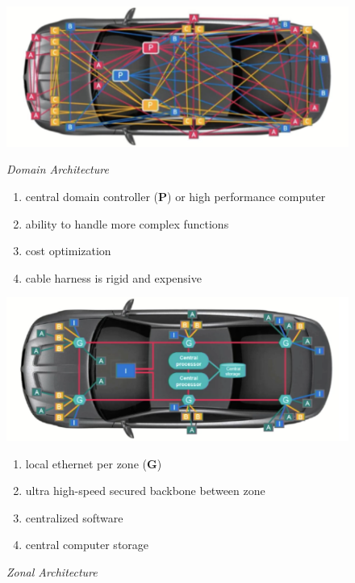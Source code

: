 \begin{figure}[h]
    \centering
    \begin{minipage}[t]{0.45\textwidth}
        \centering
        \includegraphics[width=\textwidth]{img/domain_architecture}
        \caption{\textit{Domain Architecture}}
        
        \begin{flushleft}
            \begin{enumerate}[nosep]
                \item central domain controller (\textbf{P}) or high performance computer
                \item ability to handle more complex functions
                \item cost optimization
                \item cable harness is rigid and expensive
            \end{enumerate}
        \end{flushleft}

    \end{minipage}
    \begin{minipage}[t]{0.45\textwidth}
        \centering
        \includegraphics[width=\textwidth]{img/zonal_architecture}
        \caption{\textit{Zonal Architecture}}
        
        \begin{flushleft}
            \begin{enumerate}[nosep]
                \item local ethernet per zone (\textbf{G})
                \item ultra high-speed secured backbone between zone
                \item centralized software
                \item central computer storage
            \end{enumerate}
        \end{flushleft}
        
    \end{minipage}
\end{figure}